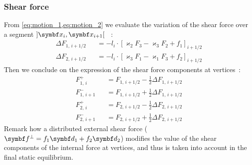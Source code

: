 \subsubsection{Shear force}
From \cref{eq:motion_1,eq:motion_2} we evaluate the variation of the shear force over a segment $]\vect{x}_{i},  \vect{x}_{i+1}[$ ~:
\begin{subequations}
	\begin{alignat}{2}
		&\Delta F_{1,\,i+1/2}^{} &&= - l_i  \cdot {[\varkappa_2 F_3 - \varkappa_3 F_2 + f_1]}_{i+1/2}
		\\
		&\Delta F_{2,\,i+1/2}^{} &&= - l_i  \cdot {[\varkappa_3 F_1 - \varkappa_1 F_3 + f_2]}_{i+1/2}
	\end{alignat}
	\label{eq:DeltaF}
\end{subequations}
Then we conclude on the expression of the shear force components at vertices~:
\begin{subequations}
	\label{eq:dFi}
	\begin{alignat}{2}
		&F_{1,\,i}^{+} &&= F_{1,\,i+1/2} - \frac{1}{2} \Delta F_{1,\,i+1/2}  \\[0.5em]
		&F_{1,\,i+1}^{-} &&= F_{1,\,i+1/2} + \frac{1}{2} \Delta F_{1,\,i+1/2} \\[0.5em]
		&F_{2,\,i}^{+} &&= F_{2,\,i+1/2} - \frac{1}{2} \Delta F_{2,\,i+1/2}  \\[0.5em]
		&F_{2,\,i+1}^{-} &&= F_{2,\,i+1/2} + \frac{1}{2} \Delta F_{2,\,i+1/2}
	\end{alignat}
\end{subequations}
Remark how a distributed external shear force ($\vect{f}^{\perp} = f_1\vect{d}_1 + f_2\vect{d}_2$) modifies the value of the shear components of the internal force at vertices, and thus is taken into account in the final static equilibrium.

